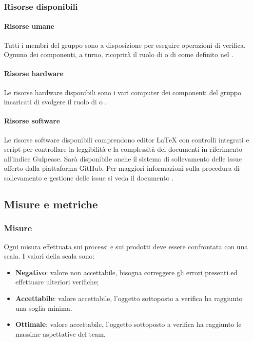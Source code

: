 \documentclass[PianoDiQualifica.tex]{subfiles}
\begin{document}
		\subsubsection{Risorse disponibili}
		
			\paragraph{Risorse umane}
			Tutti i membri del gruppo sono a disposizione per eseguire operazioni di verifica. Ognuno dei componenti, a turno, ricoprirà il ruolo di \RESP{} o di \VER{} come definito nel \PPdocRR{}.
			
			\paragraph{Risorse hardware}
			Le risorse hardware disponibili sono i vari computer dei componenti del gruppo incaricati di svolgere il ruolo di \RESP{} o \VER{}.
			
			\paragraph{Risorse software}
			Le risorse software disponibili comprendono editor \LaTeX{} con controlli integrati e script per controllare la leggibilità e la complessità dei documenti in riferimento all’indice Gulpease.
			Sarà disponibile anche il sistema di sollevamento delle issue offerto dalla piattaforma GitHub. Per maggiori informazioni sulla procedura di sollevamento e gestione delle issue si veda
			il documento \NPdocRR{}.
			
	\subsection{Misure e metriche}
	
		\subsubsection{Misure}
		Ogni misura effettuata sui processi e sui prodotti deve essere confrontata con una scala. I valori della scala sono:
		\begin{itemize}
			\item \textbf{Negativo}: valore non accettabile, bisogna correggere gli errori presenti ed effettuare ulteriori verifiche;
			\item \textbf{Accettabile}: valore accettabile, l’oggetto sottoposto a verifica ha raggiunto una soglia minima.
			\item \textbf{Ottimale}: valore accettabile, l’oggetto sottoposto a verifica ha raggiunto le massime aspettative del team.
		\end{itemize}
		
\end{document}
